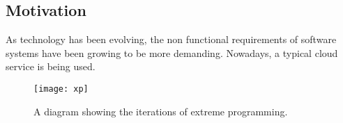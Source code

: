 \documentclass[../main.tex]{subfiles}
\begin{document}
\subsection{Motivation}

As technology has been evolving, the non functional requirements of software systems have been growing to be more demanding. Nowadays, a typical cloud service is being used.
    
\begin{figure}[ht]
    \centering
        \texttt{[image: xp]}
    \caption{A diagram showing the iterations of extreme programming.}
\end{figure}
    
\blindtext
\end{document}
